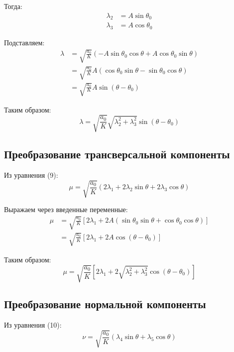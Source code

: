 \documentclass[12pt]{article}
\begin{document}
Тогда:
\begin{align}
\lambda_2 &= A \sin \theta_0 \\
\lambda_3 &= A \cos \theta_0
\end{align}

Подставляем:
\begin{align}
\lambda &= \sqrt{\frac{a_0}{K}} (-A \sin \theta_0 \cos \theta + A \cos \theta_0 \sin \theta) \\
&= \sqrt{\frac{a_0}{K}} A (\cos \theta_0 \sin \theta - \sin \theta_0 \cos \theta) \\
&= \sqrt{\frac{a_0}{K}} A \sin(\theta - \theta_0)
\end{align}

Таким образом:
\begin{equation}
\lambda = \sqrt{\frac{a_0}{K}} \sqrt{\lambda_2^2 + \lambda_3^2} \sin(\theta - \theta_0) \tag{11}
\end{equation}

\subsection{Преобразование трансверсальной компоненты}

Из уравнения (9):
\begin{equation}
\mu = \sqrt{\frac{a_0}{K}} (2\lambda_1 + 2\lambda_2 \sin \theta + 2\lambda_3 \cos \theta)
\end{equation}

Выражаем через введенные переменные:
\begin{align}
\mu &= \sqrt{\frac{a_0}{K}} [2\lambda_1 + 2A(\sin \theta_0 \sin \theta + \cos \theta_0 \cos \theta)] \\
&= \sqrt{\frac{a_0}{K}} [2\lambda_1 + 2A \cos(\theta - \theta_0)]
\end{align}

Таким образом:
\begin{equation}
\mu = \sqrt{\frac{a_0}{K}} \left[2\lambda_1 + 2\sqrt{\lambda_2^2 + \lambda_3^2} \cos(\theta - \theta_0)\right] \tag{12}
\end{equation}

\subsection{Преобразование нормальной компоненты}

Из уравнения (10):
\begin{equation}
\nu = \sqrt{\frac{a_0}{K}} (\lambda_4 \sin \theta + \lambda_5 \cos \theta)
\end{equation}
\end{document}
